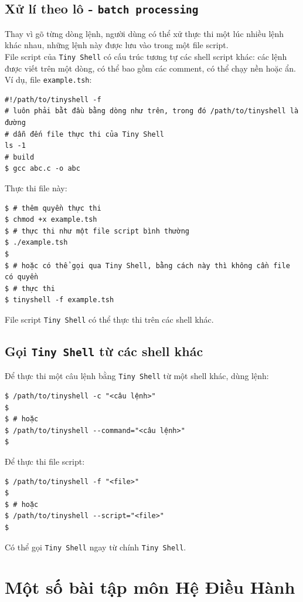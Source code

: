 \documentclass[a4paper,12pt]{report}
\begin{document}
	\section{Xử lí theo lô - \texttt{batch processing}}
        Thay vì gõ từng dòng lệnh, người dùng có thể xử thực thi một lúc nhiều
        lệnh khác nhau, những lệnh này được lưu vào trong một file script.\\
        File script của \texttt{Tiny Shell} có cấu trúc tương tự các shell
        script khác: các lệnh được viết trên một dòng, có thể bao gồm các
        comment, có thể chạy nền hoặc ẩn. Ví dụ, file \texttt{example.tsh}:
        \begin{verbatim}
#!/path/to/tinyshell -f
# luôn phải bằt đầu bằng dòng như trên, trong đó /path/to/tinyshell là đường
# dẫn đến file thực thi của Tiny Shell
ls -1
# build
$ gcc abc.c -o abc
        \end{verbatim}
        Thực thi file này:
\begin{verbatim}
$ # thêm quyền thực thi
$ chmod +x example.tsh
$ # thực thi như một file script bình thường
$ ./example.tsh
$
$ # hoặc có thể gọi qua Tiny Shell, bằng cách này thì không cần file có quyền
$ # thực thi
$ tinyshell -f example.tsh
        \end{verbatim}

        File script \texttt{Tiny Shell} có thể thực thi trên các shell khác.
	\section{Gọi \texttt{Tiny Shell} từ các shell khác}
        Để thực thi một câu lệnh bằng \texttt{Tiny Shell} từ một shell khác,
        dùng lệnh:
        \begin{verbatim}
$ /path/to/tinyshell -c "<câu lệnh>"
$ 
$ # hoặc
$ /path/to/tinyshell --command="<câu lệnh>"
$
        \end{verbatim}

        Để thực thi file script:
\begin{verbatim}
$ /path/to/tinyshell -f "<file>"
$
$ # hoặc
$ /path/to/tinyshell --script="<file>"
$
        \end{verbatim}

        Có thể gọi \texttt{Tiny Shell} ngay từ chính \texttt{Tiny Shell}.


\chapter{Một số bài tập môn Hệ Điều Hành}

        

\end{document}
